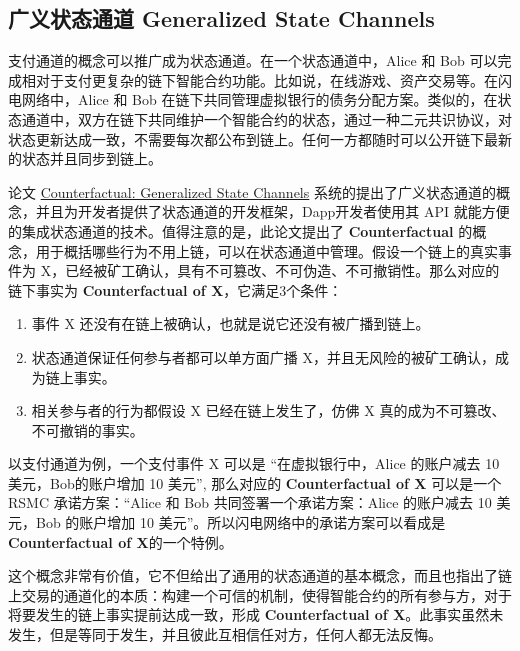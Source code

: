 \subsection{广义状态通道 Generalized State Channels}
支付通道的概念可以推广成为状态通道。在一个状态通道中，Alice 和 Bob 可以完成相对于支付更复杂的链下智能合约功能。比如说，在线游戏、资产交易等。在闪电网络中，Alice 和 Bob 在链下共同管理虚拟银行的债务分配方案。类似的，在状态通道中，双方在链下共同维护一个智能合约的状态，通过一种二元共识协议，对状态更新达成一致，不需要每次都公布到链上。任何一方都随时可以公开链下最新的状态并且同步到链上。

论文 \href{https://www.counterfactual.com/statechannels/}{Counterfactual: Generalized State Channels} 系统的提出了广义状态通道的概念，并且为开发者提供了状态通道的开发框架，Dapp开发者使用其 API 就能方便的集成状态通道的技术。值得注意的是，此论文提出了 \textbf{Counterfactual} 的概念，用于概括哪些行为不用上链，可以在状态通道中管理。假设一个链上的真实事件为 X，已经被矿工确认，具有不可篡改、不可伪造、不可撤销性。那么对应的链下事实为 \textbf{Counterfactual of X}，它满足3个条件：

\begin{enumerate}
    \item 事件 X 还没有在链上被确认，也就是说它还没有被广播到链上。
    \item 状态通道保证任何参与者都可以单方面广播 X，并且无风险的被矿工确认，成为链上事实。
    \item 相关参与者的行为都假设 X 已经在链上发生了，仿佛 X 真的成为不可篡改、不可撤销的事实。
\end{enumerate}

以支付通道为例，一个支付事件 X 可以是 “在虚拟银行中，Alice 的账户减去 10 美元，Bob的账户增加 10 美元”, 那么对应的 \textbf{Counterfactual of X} 可以是一个 RSMC 承诺方案：“Alice 和 Bob 共同签署一个承诺方案：Alice 的账户减去 10 美元，Bob 的账户增加 10 美元”。所以闪电网络中的承诺方案可以看成是\textbf{Counterfactual of X}的一个特例。

这个概念非常有价值，它不但给出了通用的状态通道的基本概念，而且也指出了链上交易的通道化的本质：构建一个可信的机制，使得智能合约的所有参与方，对于将要发生的链上事实提前达成一致，形成 \textbf{Counterfactual of X}。此事实虽然未发生，但是等同于发生，并且彼此互相信任对方，任何人都无法反悔。

